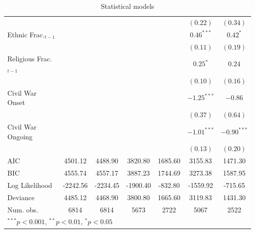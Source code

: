 \documentclass[12pt,a4paper]{article}\usepackage[]{graphicx}\usepackage[]{color}
\begin{document}
{\begin{table}
\begin{center}
\begin{footnotesize}
\begin{tabular}{l c c c c c c }
                        &               &               &              &              & $(0.22)$      & $(0.34)$      \\
Ethnic Frac.$_{t-1}$    &               &               &              &              & $0.46^{***}$  & $0.42^{*}$    \\
                        &               &               &              &              & $(0.11)$      & $(0.19)$      \\
Religious Frac.$_{t-1}$ &               &               &              &              & $0.25^{*}$    & $0.24$        \\
                        &               &               &              &              & $(0.10)$      & $(0.16)$      \\
Civil War Onset         &               &               &              &              & $-1.25^{***}$ & $-0.86$       \\
                        &               &               &              &              & $(0.37)$      & $(0.64)$      \\
Civil War Ongoing       &               &               &              &              & $-1.01^{***}$ & $-0.90^{***}$ \\
                        &               &               &              &              & $(0.13)$      & $(0.20)$      \\
\hline
AIC                     & 4501.12       & 4488.90       & 3820.80      & 1685.60      & 3155.83       & 1471.30       \\
BIC                     & 4555.74       & 4557.17       & 3887.23      & 1744.69      & 3273.38       & 1587.95       \\
Log Likelihood          & -2242.56      & -2234.45      & -1900.40     & -832.80      & -1559.92      & -715.65       \\
Deviance                & 4485.12       & 4468.90       & 3800.80      & 1665.60      & 3119.83       & 1431.30       \\
Num. obs.               & 6814          & 6814          & 5673         & 2722         & 5067          & 2522          \\
\hline
\multicolumn{7}{l}{\tiny{$^{***}p<0.001$, $^{**}p<0.01$, $^*p<0.05$}}
\end{tabular}
\end{footnotesize}
\caption{Statistical models}
\label{table:coefficients}
\end{center}
\end{table}

\clearpage
}
\end{document}
